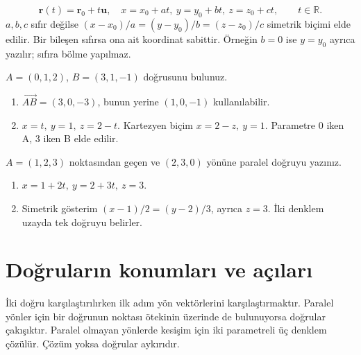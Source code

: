 {\small\[
\mathbf r(t)=\mathbf r_0+t\mathbf u,\quad x=x_0+at,\ y=y_0+bt,\ z=z_0+ct,\qquad t\in\mathbb R.
\]}
\(a,b,c\) sıfır değilse \((x-x_0)/a=(y-y_0)/b=(z-z_0)/c\) simetrik biçimi elde edilir. Bir bileşen sıfırsa ona ait koordinat sabittir. Örneğin \(b=0\) ise \(y=y_0\) ayrıca yazılır; sıfıra bölme yapılmaz.

\begin{tcolorbox}[title={Örnek 2.1 | İki noktadan geçen doğru},colframe=accent]\(A=(0,1,2)\), \(B=(3,1,-1)\) doğrusunu bulunuz.
\par{}\end{tcolorbox}
\begin{tcolorbox}[title={Adım adım çözüm},colback=green!3!white,colframe=green]\begin{enumerate}
\item \(\overrightarrow{AB}=(3,0,-3)\), bunun yerine \((1,0,-1)\) kullanılabilir.
\item \(x=t,\ y=1,\ z=2-t\). Kartezyen biçim \(x=2-z,\ y=1\). Parametre 0 iken A, 3 iken B elde edilir.
\end{enumerate}\end{tcolorbox}
\begin{tcolorbox}[title={Örnek 2.2 | Nokta ve paralel vektör},colframe=accent]\(A=(1,2,3)\) noktasından geçen ve \((2,3,0)\) yönüne paralel doğruyu yazınız.
\par{}\end{tcolorbox}
\begin{tcolorbox}[title={Adım adım çözüm},colback=green!3!white,colframe=green]\begin{enumerate}
\item \(x=1+2t,\ y=2+3t,\ z=3\).
\item Simetrik gösterim \((x-1)/2=(y-2)/3\), ayrıca \(z=3\). İki denklem uzayda tek doğruyu belirler.
\end{enumerate}\end{tcolorbox}
\section{Doğruların konumları ve açıları}
İki doğru karşılaştırılırken ilk adım yön vektörlerini karşılaştırmaktır. Paralel yönler için bir doğrunun noktası ötekinin üzerinde de bulunuyorsa doğrular çakışıktır. Paralel olmayan yönlerde kesişim için iki parametreli üç denklem çözülür. Çözüm yoksa doğrular aykırıdır.



